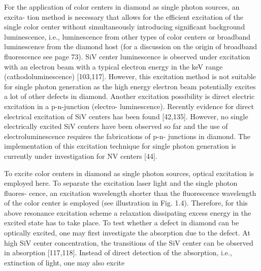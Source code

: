       For the application of color centers in diamond as single photon sources, an excita- tion method is necessary that allows for the efficient excitation of the single color center without simultaneously introducing significant background luminescence, i.e., luminescence from other types of color centers or broadband luminescence from the diamond host (for a discussion on the origin of broadband fluorescence see page 73).
      SiV center luminescence is observed under excitation with an electron beam with a typical electron energy in the keV range (cathodoluminescence) [103,117]. However, this excitation method is not suitable for single photon generation as the high energy electron beam potentially excites a lot of other defects in diamond. Another excitation possibility is direct electric excitation in a p-n-junction (electro- luminescence). Recently evidence for direct electrical excitation of SiV centers has been found [42,135]. However, no single electrically excited SiV centers have been observed so far and the use of electroluminescence requires the fabrications of p-n- junctions in diamond. The implementation of this excitation technique for single photon generation is currently under investigation for NV centers [44].

      To excite color centers in diamond as single photon sources, optical excitation is employed here. To separate the excitation laser light and the single photon fluores- cence, an excitation wavelength shorter than the fluorescence wavelength of the color center is employed (see illustration in Fig. 1.4). Therefore, for this above resonance excitation scheme a relaxation dissipating excess energy in the excited state has to take place.
      To test whether a defect in diamond can be optically excited, one may first investigate the absorption due to the defect. At high SiV center concentration, the transitions of the SiV center can be observed in absorption [117,118]. Instead of direct detection of the absorption, i.e., extinction of light, one may also excite

